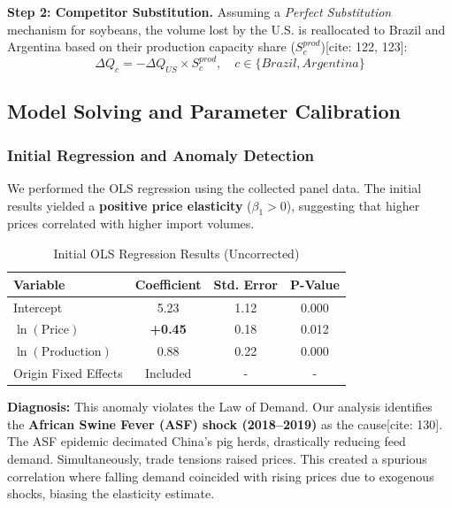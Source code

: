 \documentclass{apmcmthesis}
\begin{document}
\textbf{Step 2: Competitor Substitution.}
Assuming a \textit{Perfect Substitution} mechanism for soybeans, the volume lost by the U.S. is reallocated to Brazil and Argentina based on their production capacity share ($S_c^{prod}$)[cite: 122, 123]:
\begin{equation}
    \Delta Q_{c} = - \Delta Q_{US} \times S_c^{prod}, \quad c \in \{Brazil, Argentina\}
\end{equation}

\subsection{Model Solving and Parameter Calibration}

\subsubsection{Initial Regression and Anomaly Detection}
We performed the OLS regression using the collected panel data. The initial results yielded a \textbf{positive price elasticity} ($\beta_1 > 0$), suggesting that higher prices correlated with higher import volumes.

\begin{table}[H]
\centering
\caption{Initial OLS Regression Results (Uncorrected)}
\begin{tabular}{lccc}
\hline
\textbf{Variable} & \textbf{Coefficient} & \textbf{Std. Error} & \textbf{P-Value} \\
\hline
Intercept & 5.23 & 1.12 & 0.000 \\
$\ln(\text{Price})$ & \textbf{+0.45} & 0.18 & 0.012 \\
$\ln(\text{Production})$ & 0.88 & 0.22 & 0.000 \\
Origin Fixed Effects & Included & - & - \\
\hline
\end{tabular}
\label{tab:ols_results}
\end{table}

\textbf{Diagnosis:} This anomaly violates the Law of Demand. Our analysis identifies the \textbf{African Swine Fever (ASF) shock (2018--2019)} as the cause[cite: 130]. The ASF epidemic decimated China's pig herds, drastically reducing feed demand. Simultaneously, trade tensions raised prices. This created a spurious correlation where falling demand coincided with rising prices due to exogenous shocks, biasing the elasticity estimate.
\end{document}
